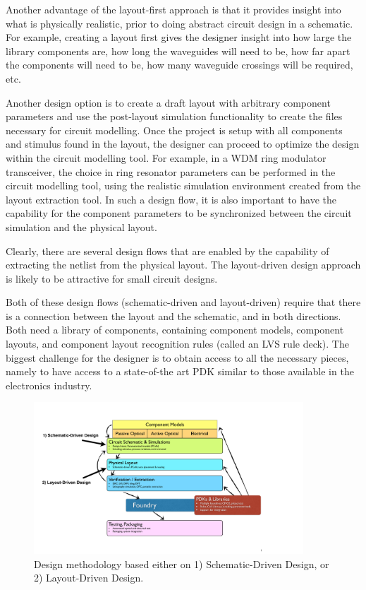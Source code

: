 \documentclass[journal]{spie}
\begin{document}
Another advantage of the layout-first approach is that it provides insight into what is physically realistic, prior to doing abstract circuit design in a schematic.  For example, creating a layout first gives the designer insight into how large the library components are, how long the waveguides will need to be, how far apart the components will need to be, how many waveguide crossings will be required, etc.  

Another design option is to create a draft layout with arbitrary component parameters and use the post-layout simulation functionality to create the files necessary for circuit modelling.  Once the project is setup with all components and stimulus found in the layout, the designer can proceed to optimize the design within the circuit modelling tool.  For example, in a WDM ring modulator transceiver, the choice in ring resonator parameters can be performed in the circuit modelling tool, using the realistic simulation environment created from the layout extraction tool.  In such a design flow, it is also important to have the capability for the component parameters to be synchronized between the circuit simulation and the physical layout.

Clearly, there are several design flows that are enabled by the capability of extracting the netlist from the physical layout.  The layout-driven design approach is likely to be attractive for small circuit designs.


Both of these design flows (schematic-driven and layout-driven) require that there is a connection between the layout and the schematic, and in both directions.  Both need a library of components, containing component models, component layouts, and component layout recognition rules (called an LVS rule deck).  The biggest challenge for the designer is to obtain access to all the necessary pieces, namely to have access to a state-of-the art PDK similar to those available in the electronics industry.  


\begin{figure}[tbp]
	\centering
	\includegraphics[width=0.9\textwidth]{../figs_paper/SDDvsLDD.pdf}
    \caption[]{Design methodology based either on 1) Schematic-Driven Design, or 2) Layout-Driven Design.}
    \label{SDDvsLDD}
\end{figure}
\end{document}
